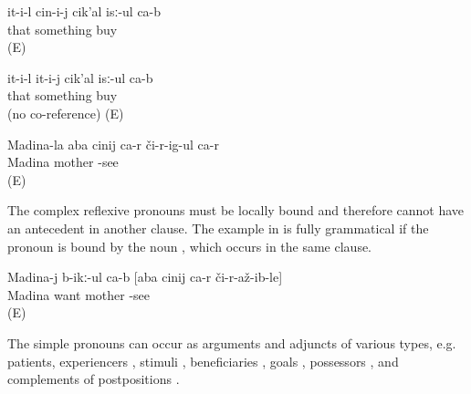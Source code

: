 \begin{exe}
	\ex	\label{ex:S/he buys himself something}
	\gll	it-i-l	cin-i-j	cik'al	isː-ul	ca-b\\
		that		something	buy	\\
	\glt	{} (E)

	\ex	\label{ex:S/he buys him/her something}
	\gll	it-i-l	it-i-j	cik'al	isː-ul	ca-b\\
		that		something	buy		\\
	\glt	{} (no co-reference) (E)

	\ex	\label{ex:Madina's mother sees herself@11a}
	\gll	Madina-la	aba	cinij	ca-r	či-r-ig-ul ca-r\\
		Madina	mother			-see \\
	\glt	{} (E)
\end{exe}

The complex reflexive pronouns must be locally bound  and therefore cannot have an antecedent in another clause. The example in  is fully grammatical if the pronoun is bound by the noun  , which occurs in the same clause.

\begin{exe}
	\ex	\label{ex:Madina wants that the mother sees herself@11b}
	\gll	Madina-j	b-ikː-ul ca-b	[aba	cinij	ca-r	či-r-až-ib-le]\\
		Madina	want 	mother			-see\\
	\glt	{} (E)
\end{exe}

The simple pronouns can occur as arguments and adjuncts of various types, e.g. patients, experiencers , stimuli , beneficiaries , goals , possessors , and complements of postpositions . 

